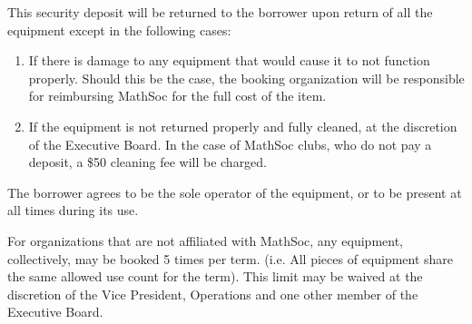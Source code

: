 This security deposit will be returned to the borrower upon return of all the
equipment except in the following cases:

\begin{enumerate}
  \item If there is damage to any equipment that would cause it to not function
    properly. Should this be the case, the booking organization will be
    responsible for reimbursing MathSoc for the full cost of the item.
  \item If the equipment is not returned properly and fully cleaned, at the
    discretion of the Executive Board. In the case of MathSoc clubs, who do not
   pay a deposit, a \$50 cleaning fee will be charged.
\end{enumerate}

The borrower agrees to be the sole operator of the equipment, or to be present
at all times during its use.

For organizations that are not affiliated with MathSoc, any equipment,
collectively, may be booked 5 times per term. (i.e. All pieces of equipment
share the same allowed use count for the term). This limit may be waived at the
discretion of the Vice President, Operations and one other member of the
Executive Board.

